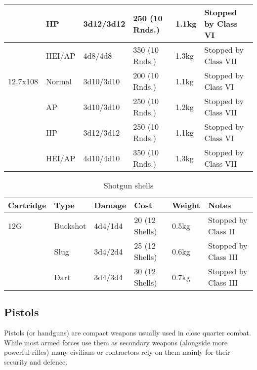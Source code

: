 \begin{table}
\begin{center}
\begin{tabular}{| l | l | l | l | l | l |}
      \,       & HP      & 3d12/3d12  & 250 (10 Rnds.) & 1.1kg & Stopped by Class VI \\ \hline
      \,       & HEI/AP  & 4d8/4d8    & 350 (10 Rnds.) & 1.3kg & Stopped by Class VII \\ \hline
      12.7x108 & Normal  & 3d10/3d10  & 200 (10 Rnds.) & 1.1kg & Stopped by Class VI \\ \hline
      \,       & AP      & 3d10/3d10  & 250 (10 Rnds.) & 1.2kg & Stopped by Class VII \\ \hline
      \,       & HP      & 3d12/3d12  & 250 (10 Rnds.) & 1.1kg & Stopped by Class VI \\ \hline
      \,       & HEI/AP  & 4d10/4d10  & 350 (10 Rnds.) & 1.3kg & Stopped by Class VII \\ \hline

    \end{tabular}
  \end{center}
\end{table}

\begin{table}
  \caption{Shotgun shells}
  \label{tab:ShotgunShells}
  \begin{center}
    \begin{tabular}{| l | l | l | l | l | l |}
      \hline
      \textbf{Cartridge}  & \textbf{Type}   & \textbf{Damage} &
      \textbf{Cost} & \textbf{Weight} & \textbf{Notes}        \\ \hline

      12G     & Buckshot & 4d4/1d4 & 20 (12 Shells) & 0.5kg & Stopped by Class II \\ \hline
      \,      & Slug     & 3d4/2d4 & 25 (12 Shells) & 0.6kg & Stopped by Class III \\ \hline
      \,      & Dart     & 3d4/3d4 & 30 (12 Shells) & 0.7kg & Stopped by Class III \\ \hline

    \end{tabular}
  \end{center}
\end{table}

\subsection{Pistols}

Pistols (or handguns) are compact weapons usually used in close quarter combat.
While most armed forces use them as secondary weapons (alongside more powerful
rifles) many civilians or contractors rely on them mainly for their security
and defence.

